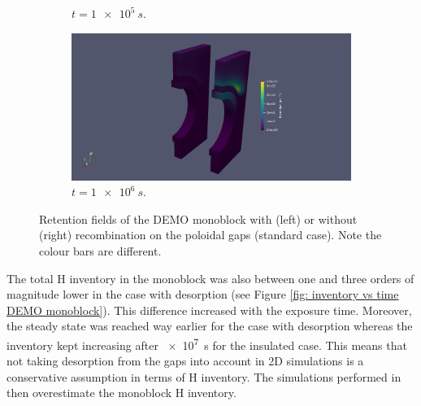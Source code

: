\begin{figure} [h]
\begin{subfigure}{0.45\linewidth}
        \caption{$t=\SI{1e5}{s}$.}
    \end{subfigure}%
    \qquad
    \begin{subfigure}{0.45\linewidth}
        \centering
        \includegraphics[trim=500 0 300 0, clip, width=\linewidth]{Figures/Chapter3/monoblocks/3D_monoblocks/retention_1e6s.png}
        \caption{$t=\SI{1e6}{s}$.}
    \end{subfigure}
    \caption{Retention fields of the DEMO monoblock with (left) or without (right) recombination on the poloidal gaps (standard case). Note the colour bars are different.}
    \label{fig:retention fields 3D monoblocks}
\end{figure}

The total H inventory in the monoblock was also between one and three orders of magnitude lower in the case with desorption (see Figure \ref{fig: inventory vs time DEMO monoblock}).
This difference increased with the exposure time.
Moreover, the steady state was reached way earlier for the case with desorption whereas the inventory kept increasing after \SI{e7}{s} for the insulated case.
This means that not taking desorption from the gaps into account in 2D simulations is a conservative assumption in terms of H inventory.
The simulations performed in  then overestimate the monoblock H inventory.

